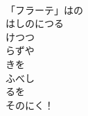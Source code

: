 \documentclass[10pt,b5j]{tarticle} %
\begin{document}
\begin{enumerate}
\begin{minipage}[c]{\blocksize}
        \vspace{\linespace}
        \item~\\
        「フラーテ」はの\\
        はしのにつる\\
        けつつ\\
        らずや\\
        きを\\
        ふべし\\
        るを\\
        そのにく！
    
    \end{minipage}
\end{enumerate} %
\end{document}
